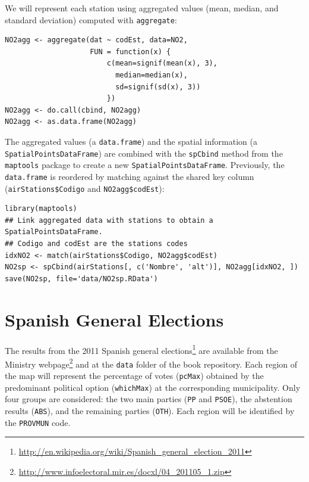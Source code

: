 \documentclass[smallroyalvopaper]{memoir}
\begin{document}
We will represent each station using aggregated values (mean, median,
and standard deviation) computed with \texttt{aggregate}:


\lstset{language=R,numbers=none}
\begin{lstlisting}
NO2agg <- aggregate(dat ~ codEst, data=NO2,
                    FUN = function(x) {
                        c(mean=signif(mean(x), 3),
                          median=median(x),
                          sd=signif(sd(x), 3))
                        })
NO2agg <- do.call(cbind, NO2agg)
NO2agg <- as.data.frame(NO2agg)
\end{lstlisting}

The aggregated values (a \texttt{data.frame}) and the spatial information (a
\texttt{SpatialPointsDataFrame}) are combined with the \texttt{spCbind} method from
the \texttt{maptools} package to create a new
\texttt{SpatialPointsDataFrame}. Previously, the \texttt{data.frame} is reordered by
matching against the shared key column (\texttt{airStations\$Codigo} and
\texttt{NO2agg\$codEst}):

 

\lstset{language=R,numbers=none}
\begin{lstlisting}
library(maptools)
## Link aggregated data with stations to obtain a SpatialPointsDataFrame.
## Codigo and codEst are the stations codes
idxNO2 <- match(airStations$Codigo, NO2agg$codEst)
NO2sp <- spCbind(airStations[, c('Nombre', 'alt')], NO2agg[idxNO2, ])
save(NO2sp, file='data/NO2sp.RData')
\end{lstlisting}

\section{Spanish General Elections}
\label{sec-2}
The results from the 2011 Spanish general elections\footnote{\url{http://en.wikipedia.org/wiki/Spanish_general_election_2011}} are
available from the Ministry webpage\footnote{\url{http://www.infoelectoral.mir.es/docxl/04_201105_1.zip}} and at the \texttt{data} folder of
the book repository. Each region of the map will represent the
percentage of votes (\texttt{pcMax}) obtained by the predominant political
option (\texttt{whichMax}) at the corresponding municipality.  Only four
groups are considered: the two main parties (\texttt{PP} and \texttt{PSOE}), the
abstention results (\texttt{ABS}), and the remaining parties (\texttt{OTH}). Each
region will be identified by the \texttt{PROVMUN} code.
\end{document}
